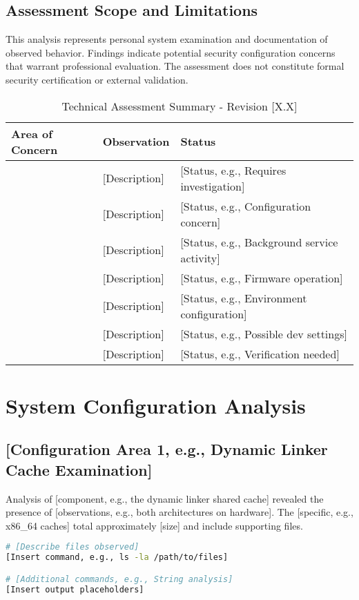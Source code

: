 \documentclass[11pt, a4paper]{article}
\begin{document}
\subsection{Assessment Scope and Limitations}
This analysis represents personal system examination and documentation of observed behavior. Findings indicate potential security configuration concerns that warrant professional evaluation. The assessment does not constitute formal security certification or external validation.

\begin{table}[H]
\centering
\caption{Technical Assessment Summary - Revision [X.X]}
\label{tab:assessment_summary}
\begin{tabular}{@{}p{4cm}p{5cm}p{3cm}@{}}
\toprule
\textbf{Area of Concern} & \textbf{Observation} & \textbf{Status} \\ \midrule
[Area 1] & [Description] & [Status, e.g., Requires investigation] \\
[Area 2] & [Description] & [Status, e.g., Configuration concern] \\
[Area 3] & [Description] & [Status, e.g., Background service activity] \\
[Area 4] & [Description] & [Status, e.g., Firmware operation] \\
[Area 5] & [Description] & [Status, e.g., Environment configuration] \\
[Area 6] & [Description] & [Status, e.g., Possible dev settings] \\
[Area 7] & [Description] & [Status, e.g., Verification needed] \\ \bottomrule
\end{tabular}
\end{table}

\section{System Configuration Analysis}

\subsection{[Configuration Area 1, e.g., Dynamic Linker Cache Examination]}
Analysis of [component, e.g., the dynamic linker shared cache] revealed the presence of [observations, e.g., both architectures on hardware]. The [specific, e.g., x86_64 caches] total approximately [size] and include supporting files.

\begin{lstlisting}[language=bash, caption={[Area] Configuration - [Date]}, label={lst:dyld_cache}]
# [Describe files observed]
[Insert command, e.g., ls -la /path/to/files]

# [Additional commands, e.g., String analysis]
[Insert output placeholders]
\end{lstlisting}
\end{document}
